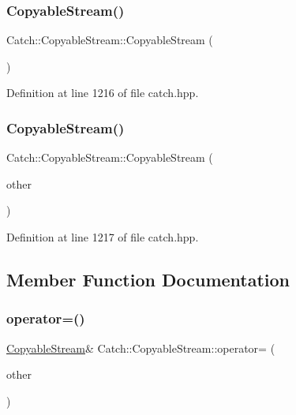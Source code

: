 \subsubsection{\texorpdfstring{Copyable\+Stream()}{CopyableStream()}\hspace{0.1cm}{\footnotesize\ttfamily [1/2]}}
{\footnotesize\ttfamily Catch\+::\+Copyable\+Stream\+::\+Copyable\+Stream (\begin{DoxyParamCaption}{ }\end{DoxyParamCaption})\hspace{0.3cm}{\ttfamily [inline]}}



Definition at line 1216 of file catch.\+hpp.

\hypertarget{struct_catch_1_1_copyable_stream_a0e72dc16240653f52c17106f4bf34da8}{}\label{struct_catch_1_1_copyable_stream_a0e72dc16240653f52c17106f4bf34da8} 
\subsubsection{\texorpdfstring{Copyable\+Stream()}{CopyableStream()}\hspace{0.1cm}{\footnotesize\ttfamily [2/2]}}
{\footnotesize\ttfamily Catch\+::\+Copyable\+Stream\+::\+Copyable\+Stream (\begin{DoxyParamCaption}\item[{\hyperlink{struct_catch_1_1_copyable_stream}{Copyable\+Stream} const \&}]{other }\end{DoxyParamCaption})\hspace{0.3cm}{\ttfamily [inline]}}



Definition at line 1217 of file catch.\+hpp.



\subsection{Member Function Documentation}
\hypertarget{struct_catch_1_1_copyable_stream_a1760fa29b38011c5845171260bec0966}{}\label{struct_catch_1_1_copyable_stream_a1760fa29b38011c5845171260bec0966} 
\subsubsection{\texorpdfstring{operator=()}{operator=()}}
{\footnotesize\ttfamily \hyperlink{struct_catch_1_1_copyable_stream}{Copyable\+Stream}\& Catch\+::\+Copyable\+Stream\+::operator= (\begin{DoxyParamCaption}\item[{\hyperlink{struct_catch_1_1_copyable_stream}{Copyable\+Stream} const \&}]{other }\end{DoxyParamCaption})\hspace{0.3cm}{\ttfamily [inline]}}



